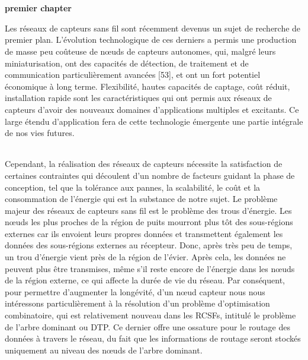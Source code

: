 \chapter{}
\begin{center}
	\Huge\textbf{premier chapter}	
\end{center}


Les réseaux de capteurs sans fil sont récemment devenus un sujet de recherche de premier plan. L’évolution technologique de ces derniers a permis une production de masse peu coûteuse de nœuds de capteurs autonomes, qui, malgré leurs miniaturisation, ont des capacités de détection, de traitement et de communication particulièrement avancées [53], et ont un fort potentiel économique à long terme. Flexibilité, hautes capacités de captage, coût réduit, installation rapide sont les caractéristiques qui ont permis aux réseaux de capteurs d’avoir des nouveaux domaines d’applications multiples et excitants. Ce large étendu d’application fera de cette technologie émergente une partie intégrale de nos vies futures.
\subparagraph{}
Cependant, la réalisation des réseaux de capteurs nécessite la satisfaction de certaines contraintes qui découlent d’un nombre de facteurs guidant la phase de conception, tel que la tolérance aux pannes, la scalabilité, le coût et la consommation de l’énergie qui est la substance de notre sujet.
Le problème majeur des réseaux de capteurs sans fil est le problème des trous d’énergie. Les nœuds les plus proches de la région de puits mourront plus tôt des sous-régions externes car ils envoient leurs propres données et transmettent également les données des sous-régions externes au récepteur. Donc, après très peu de temps, un trou d’énergie vient près de la région de l’évier. Après cela, les données ne peuvent plus être transmises, même s'il reste encore de l'énergie dans les nœuds de la région externe, ce qui affecte la durée de vie du réseau. Par conséquent, pour permettre d’augmenter la  longévité, d’un nœud capteur nous nous intéressons particulièrement à la résolution d’un problème d’optimisation combinatoire, qui est relativement nouveau dans les RCSFs, intitulé le problème de l’arbre dominant ou DTP.  Ce dernier offre une ossature pour le routage des données à travers le réseau, du fait que les informations de routage seront stockés uniquement au niveau des nœuds de l’arbre dominant. 
\subparagraph{}
